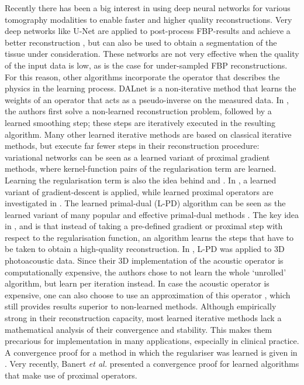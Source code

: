 \documentclass[journal]{IEEEtran}
\begin{document}
Recently there has been a big interest in using deep neural networks for various tomography modalities to enable faster and higher quality reconstructions. Very deep networks like U-Net \cite{Ronneberger2015} are applied to post-process FBP-results and achieve a better reconstruction \cite{Jin2017, Antholzer2017, Kofler2018, Waibel2018}, but can also be used to obtain a segmentation of the tissue under consideration. These networks are not very effective when the quality of the input data is low, as is the case for under-sampled FBP reconstructions. For this reason, other algorithms incorporate the operator that describes the physics in the learning process. DALnet \cite{Schwab2018} is a non-iterative method that learns the weights of an operator that acts as a pseudo-inverse on the measured data. In \cite{Kelly2017}, the authors first solve a non-learned reconstruction problem, followed by a learned smoothing step; these steps are iteratively executed in the resulting algorithm. Many other learned iterative methods are based on classical iterative methods, but execute far fewer steps in their reconstruction procedure: variational networks \cite{Kobler2017b, Hammernik2017f, Hammernik2018} can be seen as a learned variant of proximal gradient methods, where kernel-function pairs of the regularisation term are learned. Learning the regularisation term is also the idea behind \cite{Chen2018} and \cite{Li2018}. In \cite{Adler2017a}, a learned variant of gradient-descent is applied, while learned proximal operators are investigated in \cite{Meinhardt2017}. The learned primal-dual (L-PD) algorithm \cite{Adler2018} can be seen as the learned variant of many popular and effective primal-dual methods \cite{Esser2010}. The key idea in \cite{Adler2017a}, \cite{Meinhardt2017} and \cite{Adler2018} is that instead of taking a pre-defined gradient or proximal step with respect to the regularisation function, an algorithm learns the steps that have to be taken to obtain a high-quality reconstruction. In \cite{Hauptmann2018}, L-PD was applied to 3D photoacoustic data. Since their 3D implementation of the acoustic operator is computationally expensive, the authors chose to not learn the whole `unrolled' algorithm, but learn per iteration instead. In case the acoustic operator is expensive, one can also choose to use an approximation of this operator \cite{Hauptmann2018b}, which still provides results superior to non-learned methods. Although empirically strong in their reconstruction capacity, most learned iterative methods lack a mathematical analysis of their convergence and stability. This makes them precarious for implementation in many applications, especially in clinical practice. A convergence proof for a method in which the regulariser was learned is given in \cite{Li2018}. Very recently, Banert \emph{et al.} \cite{Banert2018} presented a convergence proof for learned algorithms that make use of proximal operators.
\end{document}
